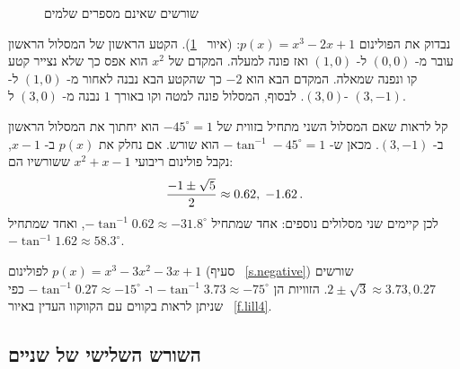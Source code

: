 \begin{figure}[tb]
\begin{center}
\end{center}
\caption{שורשים שאינם מספרים שלמים}\label{f.lill6}
\end{figure}

נבדוק את הפולינום
$p(x)=x^3-2x+1$:
(איור~%
\ref{f.lill6}).
הקטע הראשון של המסלול הראשון עובר מ-%
$(0,0)$
ל-%
$(1,0)$
ואז פונה למעלה. המקדם של
$x^2$
הוא אפס כך שלא נצייר קטע קו ונפנה שמאלה. המקדם הבא הוא
$-2$
כך שהקטע הבא נבנה לאחור מ-%
$(1,0)$
ל-%
$(3,0)$.
לבסוף, המסלול פונה למטה וקו באורך 
$1$
נבנה מ-%
$(3,0)$
ל-%
$(3,-1)$.

קל לראות שאם המסלול השני מתחיל בזווית של
$-45^\circ=1$
הוא יחתוך את המסלול הראשון ב-%
$(3,-1)$.
מכאן ש-%
$-\tan^{-1} -45^\circ=1$
הוא שורש. אם נחלק את
$p(x)$
ב-%
$x-1$,
נקבל פולינום ריבועי
$x^2+x-1$
ששורשיו הם:
\[
\displaystyle\frac{-1\pm\sqrt{5}}{2} \approx 0.62,\; -1.62\,.
\]
לכן קיימים שני מסלולים נוספים: אחד שמתחיל
$-\tan^{-1} 0.62\approx -31.8^\circ$,
ואחד שמתחיל
$-\tan^{-1}1.62\approx 58.3^\circ$.

לפולינום 
$p(x)=x^3-3x^2-3x+1$
(סעיף%
~\ref{s.negative})
שורשים
$ 2\pm\sqrt{3}\approx 3.73, 0.27$.
הזוויות הן
$-\tan^{-1} 3.73 \approx -75^\circ$
ו-%
$-\tan^{-1} 0.27 \approx -15^\circ$
כפי שניתן לראות בקווים עם הקווקוו העדין באיור%
~\ref{f.lill4}.

\subsection{השורש השלישי של שניים}

